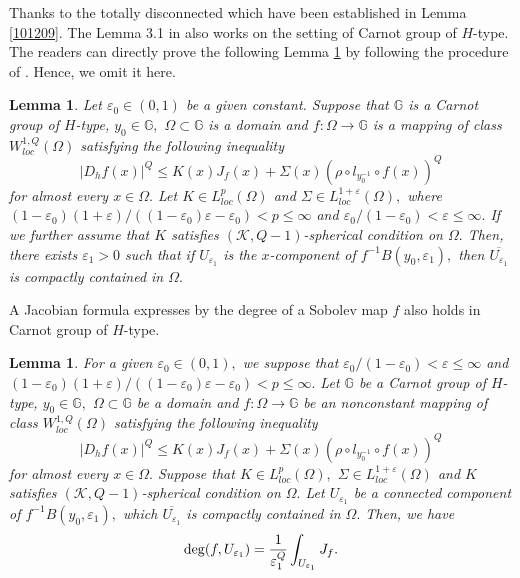 \documentclass[11pt,twoside]{article}
\newtheorem{lem}[thm]{Lemma}
\theoremstyle{definition}
\theoremstyle{remark}
\begin{document}
Thanks to the totally disconnected which have been established in Lemma \ref{101209}. The Lemma 3.1 in  \cite{KO221} also works on the setting of Carnot group of $H$-type. The readers can directly prove the following Lemma \ref{9981} by following the procedure of \cite[Lemma 3.1]{KO221}. Hence, we omit it here.
\begin{lem}\label{9981}
Let $\varepsilon_{0}\in(0,1)$ be a given constant. Suppose that $\mathbb{G}$ is a Carnot group of $H$-type,  $y_{0}\in\mathbb{G},$ $\Omega\subset\mathbb{G}$ is a domain and $f:\Omega\rightarrow \mathbb{G}$ is a mapping of class $W_{loc}^{1,Q}(\Omega)$ satisfying  the following inequality
$$\vert D_{h}f(x)\vert^{Q}\leq K(x)J_{f}(x)+\Sigma(x)(\rho\circ l_{y_{0}^{-1}}\circ f(x))^{Q}$$
for almost every $x\in\Omega.$ Let $K\in L_{loc}^{p}(\Omega)$ and $\Sigma\in L_{loc}^{1+\varepsilon}(\Omega),$ where $(1-\varepsilon_{0})(1+\varepsilon)/((1-\varepsilon_{0})\varepsilon-\varepsilon_{0})<p\leq\infty$ and $\varepsilon_{0}/(1-\varepsilon_{0})<\varepsilon\leq\infty.$  If we further assume that $K$  satisfies $(\mathcal{K},Q-1)$-spherical  condition on $\Omega.$ Then, there exists $\varepsilon_{1}>0$ such that if $U_{\varepsilon_{1}}$ is the $x$-component of $f^{-1}B(y_{0},\varepsilon_{1}),$ then $\overline{U_{\varepsilon_{1}}}$ is compactly contained in $\Omega.$
\end{lem}





A Jacobian formula expresses by the degree of a Sobolev map $f$ also holds in Carnot group of $H$-type. 
\begin{lem}\label{lomlm}
For a given $\varepsilon_{0}\in(0,1),$ we suppose that $\varepsilon_{0}/(1-\varepsilon_{0})<\varepsilon\leq\infty$ and $(1-\varepsilon_{0})(1+\varepsilon)/((1-\varepsilon_{0})\varepsilon-\varepsilon_{0})<p\leq\infty.$ Let $\mathbb{G}$ be a Carnot group of $H$-type,  $y_{0}\in\mathbb{G},$ $\Omega\subset\mathbb{G}$ be a domain and $f:\Omega\rightarrow \mathbb{G}$ be an nonconstant mapping of class $W_{loc}^{1,Q}(\Omega)$ satisfying  the following inequality
$$\vert D_{h}f(x)\vert^{Q}\leq K(x)J_{f}(x)+\Sigma(x)(\rho\circ l_{y_{0}^{-1}}\circ f(x))^{Q}$$
for almost every $x\in\Omega.$ Suppose that $K\in L_{loc}^{p}(\Omega),$  $\Sigma\in L_{loc}^{1+\varepsilon}(\Omega)$  and $K$ satisfies $(\mathcal{K},Q-1)$-spherical  condition on $\Omega.$ Let $U_{\varepsilon_{1}}$ be a connected component of $f^{-1}B(y_{0},\varepsilon_{1}),$ which $\overline{U_{\varepsilon_{1}}}$ is compactly contained in $\Omega.$ Then, we have
\begin{equation}
{\rm deg}(f,U_{\varepsilon_{1}})=\frac{1}{\varepsilon_{1}^{Q}}\int_{U_{\varepsilon_{1}}}J_{f}.
\end{equation}
\end{lem}
\end{document}
